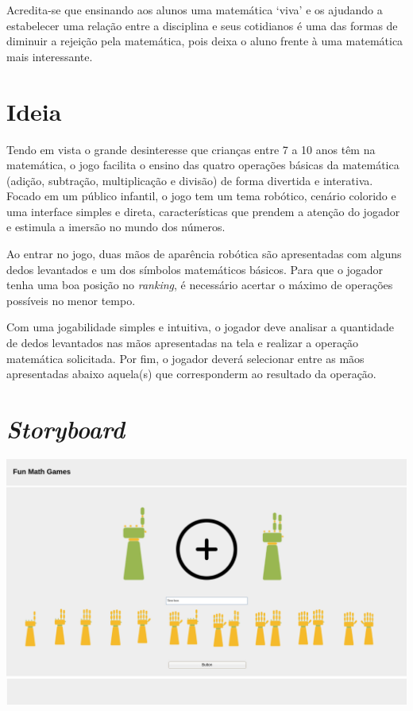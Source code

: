 \documentclass[
    12pt,               %
    openany,          	%
    twoside,            %
    a4paper,            %
    brazil              %
    ]{abntex2}
\begin{document}
Acredita-se que ensinando aos alunos uma matemática `viva' e os ajudando a
estabelecer uma relação entre a disciplina e seus cotidianos é uma das formas
de diminuir a rejeição pela matemática, pois deixa o aluno frente à uma
matemática mais interessante.

\chapter{Ideia}

Tendo em vista o grande desinteresse que crianças entre 7 a 10 anos têm na
matemática, o jogo facilita o ensino das quatro operações básicas da matemática
(adição, subtração, multiplicação e divisão) de forma divertida e interativa.
Focado em um público infantil, o jogo tem um tema robótico, cenário colorido e
uma interface simples e direta, características que prendem a atenção do
jogador e estimula a imersão no mundo dos números.

Ao entrar no jogo, duas mãos de aparência robótica são apresentadas com alguns
dedos levantados e um dos símbolos matemáticos básicos. Para que o jogador
tenha uma boa posição no \textit{ranking}, é necessário acertar o máximo de
operações possíveis no menor tempo.

Com uma jogabilidade simples e intuitiva, o jogador deve analisar a quantidade
de dedos levantados nas mãos apresentadas na tela e realizar a operação
matemática solicitada. Por fim, o jogador deverá selecionar entre as mãos
apresentadas abaixo aquela(s) que corresponderm ao resultado da operação.

\chapter{\textit{Storyboard}}

\includegraphics[scale=0.3]{storyboard}
\end{document}
